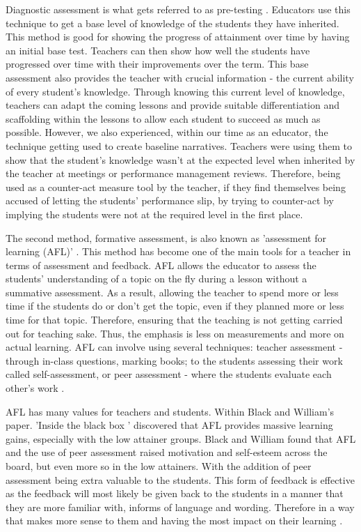 		Diagnostic assessment is what gets referred to as pre-testing \cite{wellington2007secondary}. Educators use this technique to get a base level of knowledge of the students they have inherited. This method is good for showing the progress of attainment over time by having an initial base test. Teachers can then show how well the students have progressed over time with their improvements over the term. This base assessment also provides the teacher with crucial information - the current ability of every student's knowledge. Through knowing this current level of knowledge, teachers can adapt the coming lessons and provide suitable differentiation and scaffolding within the lessons to allow each student to succeed as much as possible. However, we also experienced, within our time as an educator, the technique getting used to create baseline narratives. Teachers were using them to show that the student's knowledge wasn't at the expected level when inherited by the teacher at meetings or performance management reviews. Therefore, being used as a counter-act measure tool by the teacher, if they find themselves being accused of letting the students' performance slip, by trying to counter-act by implying the students were not at the required level in the first place.
	
		The second method, formative assessment, is also known as 'assessment for learning (AFL)' \cite{wellington2007secondary, dillon2011becoming}. This method has become one of the main tools for a teacher in terms of assessment and feedback. AFL allows the educator to assess the students' understanding of a topic on the fly during a lesson without a summative assessment. As a result, allowing the teacher to spend more or less time if the students do or don't get the topic, even if they planned more or less time for that topic. Therefore, ensuring that the teaching is not getting carried out for teaching sake. Thus, the emphasis is less on measurements and more on actual learning. AFL can involve using several techniques: teacher assessment - through in-class questions, marking books; to the students assessing their work called self-assessment, or peer assessment - where the students evaluate each other's work \cite{wellington2007secondary}.
	
		AFL has many values for teachers and students. Within Black and William's paper. 'Inside the black box \cite{black1998inside}' discovered that AFL provides massive learning gains, especially with the low attainer groups. Black and William found that AFL and the use of peer assessment raised motivation and self-esteem across the board, but even more so in the low attainers. With the addition of peer assessment being extra valuable to the students. This form of feedback is effective as the feedback will most likely be given back to the students in a manner that they are more familiar with, informs of language and wording. Therefore in a way that makes more sense to them and having the most impact on their learning \cite{torrance1998investigating, black1998inside}.
	
